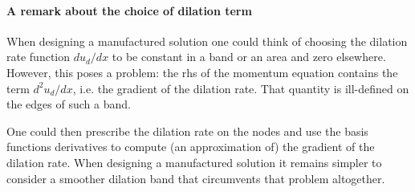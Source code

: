 \paragraph{A remark about the choice of dilation term}

When designing a manufactured solution one could think of choosing the dilation rate 
function $du_d/dx$ to be constant in a band or an area and 
zero elsewhere. However, this poses a problem: the rhs of the momentum equation 
contains the term $d^2u_d/dx$, i.e. the gradient of the dilation rate. That quantity is 
ill-defined on the edges of such a band. 

One could then prescribe the dilation rate on the nodes and use the basis functions derivatives
to compute (an approximation of) the gradient of the dilation rate. 
When designing a manufactured solution it remains simpler to consider a smoother dilation 
band that circumvents that problem altogether. 


